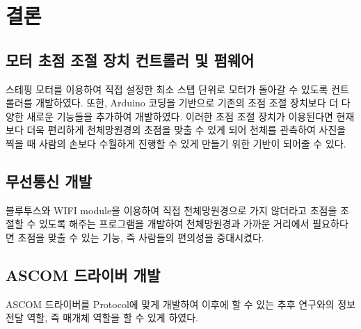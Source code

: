 \section{결론}

\subsection{모터 초점 조절 장치 컨트롤러 및 펌웨어}

스테핑 모터를 이용하여 직접 설정한 최소 스텝 단위로 모터가 돌아갈 수 있도록 컨트롤러를 개발하였다. 또한, Arduino 코딩을 기반으로 기존의 초점 조절 장치보다 더 다양한 새로운 기능들을 추가하여 개발하였다. 이러한 초점 조절 장치가 이용된다면 현재보다 더욱 편리하게 천체망원경의 초점을 맞출 수 있게 되어 천체를 관측하여 사진을 찍을 때 사람의 손보다 수월하게 진행할 수 있게 만들기 위한 기반이 되어줄 수 있다.

\subsection{무선통신 개발}

블루투스와 WIFI module을 이용하여 직접 천체망원경으로 가지 않더라고 초점을 조절할 수 있도록 해주는 프로그램을 개발하여 천체망원경과 가까운 거리에서 필요하다면 초점을 맞출 수 있는 기능, 즉 사람들의 편의성을 증대시켰다.

\subsection{ASCOM 드라이버 개발}

ASCOM 드라이버를 Protocol에 맞게 개발하여 이후에 할 수 있는 추후 연구와의 정보 전달 역할, 즉 매개체 역할을 할 수 있게 하였다.
